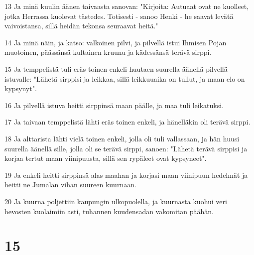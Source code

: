 \par 13 Ja minä kuulin äänen taivaasta sanovan: "Kirjoita: Autuaat ovat ne kuolleet, jotka Herrassa kuolevat tästedes. Totisesti - sanoo Henki - he saavat levätä vaivoistansa, sillä heidän tekonsa seuraavat heitä."
\par 14 Ja minä näin, ja katso: valkoinen pilvi, ja pilvellä istui Ihmisen Pojan muotoinen, päässänsä kultainen kruunu ja kädessänsä terävä sirppi.
\par 15 Ja temppelistä tuli eräs toinen enkeli huutaen suurella äänellä pilvellä istuvalle: "Lähetä sirppisi ja leikkaa, sillä leikkuuaika on tullut, ja maan elo on kypsynyt".
\par 16 Ja pilvellä istuva heitti sirppinsä maan päälle, ja maa tuli leikatuksi.
\par 17 Ja taivaan temppelistä lähti eräs toinen enkeli, ja hänelläkin oli terävä sirppi.
\par 18 Ja alttarista lähti vielä toinen enkeli, jolla oli tuli vallassaan, ja hän huusi suurella äänellä sille, jolla oli se terävä sirppi, sanoen: "Lähetä terävä sirppisi ja korjaa tertut maan viinipuusta, sillä sen rypäleet ovat kypsyneet".
\par 19 Ja enkeli heitti sirppinsä alas maahan ja korjasi maan viinipuun hedelmät ja heitti ne Jumalan vihan suureen kuurnaan.
\par 20 Ja kuurna poljettiin kaupungin ulkopuolella, ja kuurnasta kuohui veri hevosten kuolaimiin asti, tuhannen kuudensadan vakomitan päähän.

\chapter{15}

